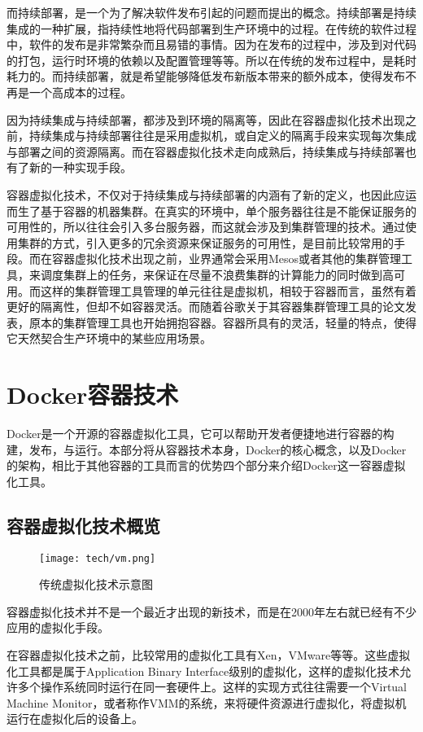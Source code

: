 而持续部署，是一个为了解决软件发布引起的问题而提出的概念。持续部署是持续集成的一种扩展，指持续性地将代码部署到生产环境中的过程。在传统的软件过程中，软件的发布是非常繁杂而且易错的事情。因为在发布的过程中，涉及到对代码的打包，运行时环境的依赖以及配置管理等等。所以在传统的发布过程中，是耗时耗力的。而持续部署，就是希望能够降低发布新版本带来的额外成本，使得发布不再是一个高成本的过程。\cite{CruiseControls}

因为持续集成与持续部署，都涉及到环境的隔离等，因此在容器虚拟化技术出现之前，持续集成与持续部署往往是采用虚拟机，或自定义的隔离手段来实现每次集成与部署之间的资源隔离。而在容器虚拟化技术走向成熟后，持续集成与持续部署也有了新的一种实现手段。

容器虚拟化技术，不仅对于持续集成与持续部署的内涵有了新的定义，也因此应运而生了基于容器的机器集群。在真实的环境中，单个服务器往往是不能保证服务的可用性的，所以往往会引入多台服务器，而这就会涉及到集群管理的技术。通过使用集群的方式，引入更多的冗余资源来保证服务的可用性，是目前比较常用的手段。而在容器虚拟化技术出现之前，业界通常会采用Mesos或者其他的集群管理工具，来调度集群上的任务，来保证在尽量不浪费集群的计算能力的同时做到高可用。而这样的集群管理工具管理的单元往往是虚拟机，相较于容器而言，虽然有着更好的隔离性，但却不如容器灵活。而随着谷歌关于其容器集群管理工具的论文发表\cite{Borg}，原本的集群管理工具也开始拥抱容器。容器所具有的灵活，轻量的特点，使得它天然契合生产环境中的某些应用场景。

\section{Docker容器技术}

Docker是一个开源的容器虚拟化工具，它可以帮助开发者便捷地进行容器的构建，发布，与运行。本部分将从容器技术本身，Docker的核心概念，以及Docker的架构，相比于其他容器的工具而言的优势四个部分来介绍Docker这一容器虚拟化工具。

\subsection{容器虚拟化技术概览}

\begin{figure}[!htp]
  \centering
  \texttt{[image: tech/vm.png]}
  \caption{传统虚拟化技术示意图}
  \label{fig:vm}
\end{figure}

容器虚拟化技术并不是一个最近才出现的新技术，而是在2000年左右就已经有不少应用的虚拟化手段。

在容器虚拟化技术之前，比较常用的虚拟化工具有Xen，VMware等等。这些虚拟化工具都是属于Application Binary Interface级别的虚拟化，这样的虚拟化技术允许多个操作系统同时运行在同一套硬件上。这样的实现方式往往需要一个Virtual Machine Monitor，或者称作VMM的系统，来将硬件资源进行虚拟化，将虚拟机运行在虚拟化后的设备上。

